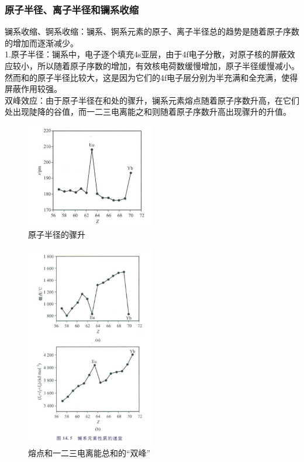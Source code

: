 \documentclass[a4paper,UTF8]{article}
\begin{document}
\subsubsection{原子半径、离子半径和镧系收缩}

镧系收缩、锕系收缩：镧系、锕系元素的原子、离子半径总的趋势是随着原子序数的增加而逐渐减少。\\

1.原子半径：镧系中，电子逐个填充4s亚层，由于4f电子分散，对原子核的屏蔽效应较小，所以随着原子序数的增加，有效核电荷数缓慢增加，原子半径缓慢减小。然而和的原子半径比较大，这是因为它们的4f电子层分别为半充满和全充满，使得屏蔽作用较强。\\

双峰效应：由于原子半径在和处的骤升，镧系元素熔点随着原子序数升高，在它们处出现陡降的谷值，而一二三电离能之和则随着原子序数升高出现骤升的升值。\\

\begin{figure}[htpb]
	\centering
	\includegraphics[width=0.5\textwidth]{figure//双峰效应1.png}
	\caption{原子半径的骤升}
	\label{fig:}
\end{figure}

\begin{figure}[htpb]
	\centering
	\includegraphics[width=0.5\textwidth]{figure//双峰效应2.png}
	\caption{熔点和一二三电离能总和的“双峰”}
	\label{fig:}
\end{figure}
\end{document}
